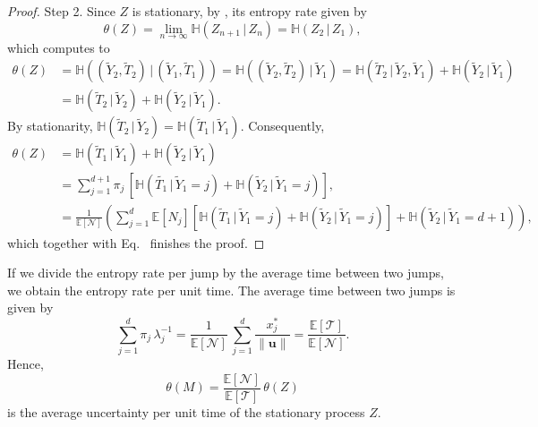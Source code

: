 \documentclass[smallextended]{svjour3}
\makeatletter
\renewcommand*{\eqref}[1]{%
  \hyperref[{#1}]{\textup{\tagform@{\ref*{#1}}}}%
}
\renewcommand{\vec}[1]{\mathbf{#1}}
\newcommand{\E}{\mathbb{E}}
\newcommand{\TT}{\mathcal{T}}
\renewcommand{\H}{\mathbb{H}}
\newcommand{\suml}{\sum\limits}
\newcommand{\liml}{\lim\limits}
\newcommand{\vnorms}[1]{\|#1\|}
\makeatother
\begin{document}
\begin{proof}
Step 2. Since $Z$ is stationary, by \citet[Theorem~4.2.1]{Cover2006}, its entropy rate given by
\begin{equation}
  \theta(Z) = \liml_{n\to\infty} \H(Z_{n+1}\,|\,Z_n) = \H(Z_2\,|\,Z_1),
\end{equation}
which computes to
\begin{equation}
 \begin{aligned}
   \theta(Z) 
   &= \H((\widetilde{Y}_2,\widetilde{T}_2)\,|\,(\widetilde{Y}_1,\widetilde{T}_1))
   = \H((\widetilde{Y}_2,\widetilde{T}_2)\,|\,\widetilde{Y}_1)
   = \H(\widetilde{T}_2\,|\,\widetilde{Y}_2,\widetilde{Y}_1) + \H(\widetilde{Y}_2\,|\,\widetilde{Y}_1)\\
   &= \H(\widetilde{T}_2\,|\,\widetilde{Y}_2) + \H(\widetilde{Y}_2\,|\,\widetilde{Y}_1).
 \end{aligned}
\end{equation}
By stationarity, $\H(\widetilde{T}_2\,|\,\widetilde{Y}_2) = \H(\widetilde{T}_1\,|\,\widetilde{Y}_1)$.
Consequently,
\begin{equation}
 \begin{aligned}
  \theta(Z)
  &= \H(\widetilde{T}_1\,|\,\widetilde{Y}_1) + \H(\widetilde{Y}_2\,|\,\widetilde{Y}_1)\\
  &= \suml_{j=1}^{d+1} \pi_j\,\left[\H(\widetilde{T_1}\,|\,\widetilde{Y}_1=j) + \H(\widetilde{Y}_2\,|\,\widetilde{Y}_1=j)\right],\\
  &= \frac{1}{\E\left[\mathcal{N}\right]} \left(\suml_{j=1}^d \E\left[N_j\right] \left[\H(\widetilde{T}_1\,|\,\widetilde{Y}_1=j) + \H(\widetilde{Y}_2\,|\,\widetilde{Y}_1=j)\right] + \H(\widetilde{Y}_2\,|\,\widetilde{Y}_1=d+1)\right),
 \end{aligned}
\end{equation}
which together with Eq.~\eqref{eqn:H_number_of_visits} finishes the proof.
\end{proof}
If we divide the entropy rate per jump by the average time between two jumps, we obtain the entropy rate per unit time.
The average time between two jumps is given by
\begin{equation}
  \suml_{j=1}^d\pi_j\,\lambda_j^{-1} = \frac{1}{\E\left[\mathcal{N}\right]}\,\suml_{j=1}^d \frac{x^\ast_j}{\vnorms{\vec{u}}} = \frac{\E\left[\TT\right]}{\E\left[\mathcal{N}\right]}.
\end{equation}
Hence,
\begin{equation}
  \theta(M) = \frac{\E\left[\mathcal{N}\right]}{\E\left[\TT\right]}\,\theta(Z)
\end{equation}
is the average uncertainty per unit time of the stationary process $Z$.
\end{document}
